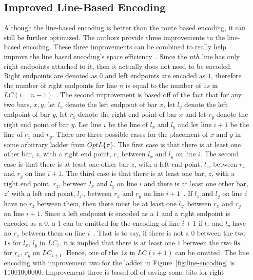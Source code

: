 \subsection{Improved Line-Based Encoding}
Although the line-based encoding is better than the route based 
encoding, it can still be further optimized. The authors provide 
three improvements to the line-based encoding. These three improvements
can be combined to really help improve the line based encoding's 
space efficiency~\cite{A5}. Since the $nth$ line has only right endpoints attached to it, 
then it actually does not need to be encoded. Right endpoints 
are denoted as $0$ and left endpoints are encoded as $1$, therefore the number of right endpoints 
for line $n$ is equal to the number of $1s$ in $LC(i=n-1)$~\cite{A5}.
The second improvement is based off of the fact that for any two bars,
$x,y$, let $l_{x}$ denote the left endpoint of bar $x$, let 
$l_{y}$ denote the left endpoint of bar $y$, let $r_{x}$ denote 
the right end point of bar $x$ and let $r_{y}$ denote the right 
end point of bar $y$. Let line $i$ be the line of $l_{x}$ and $l_{y}$
and let line $i+1$ be the line of $r_{x}$ and $r_{y}$.
There are three possible cases for the placement of $x$ and $y$ in some arbitrary ladder from $OptL\{\pi\}$. 
The first case is that there 
is at least one other bar, $z$, with a right end point, $r_{z}$ between $l_{x}$
and $l_{y}$ on line $i$. The second case is that there is at least one other bar 
$z$, with a left end point, $l_{z}$, between $r_{x}$ and $r_{y}$ on line $i+1$. 
The third case is that there is at least one bar, $z$, with a right end point, 
$r_{z}$, between $l_{x}$ and $l_{y}$ on line $i$ and there is at least one other bar, 
$z\prime$ with a left end point, $l_{z\prime}$, between $r_{x}$ and $r_{y}$ on line $i+1$~\cite{A5}. 
If $l_{x}$ and $l_{y}$ on line $i$ have no $r_{z}$ between them, 
then there must be at least one $l_{z\prime}$ between $r_{x}$ and $r_{y}$ on line $i+1$.
Since a left endpoint is encoded as a $1$ and a right endpoint is encoded as a $0$, 
a $1$ can be omitted for the encoding of line $i+1$ if $l_{x}$ and $l_{y}$ have no $r_{z}$
between them on line $i$~\cite{A5}. That is to say, if there is not a $0$ between 
the two  $1s$ for $l_{x}$, $l_{y}$ in $LC_{i}$, it is implied that there is at least one $1$ between 
the two $0s$ for $r_{x}$, $r_{y}$ on $LC_{i+1}$. Hence, one of the $1s$ in $LC(i+1)$ can be omitted. 
The line encoding with improvement two for the ladder in Figure~\ref{fig:line-encoding} is $11\underline{0}010\underline{0}00\underline{0}0$.
Improvement three is based off of saving some bits for right 
